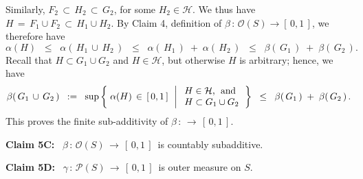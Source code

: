 Similarly, $F_{2} \,\subset\, H_{2} \,\subset\, G_{2}$, for some $H_{2} \in \mathcal{H}$.
We thus have $H \,=\, F_{1} \cup F_{2} \,\subset\, H_{1} \cup H_{2}$.
By Claim 4, definition of $\beta \,:\, \mathcal{O}(S) \longrightarrow [\,0,1\,]$, we therefore have
\begin{equation*}
\alpha(H)
\;\; \leq \;\; \alpha\!\left(\,H_{1}\,\cup\,H_{2}\,\right)
\;\; \leq \;\; \alpha\!\left(\,H_{1}\,\right) \; + \; \alpha\!\left(\,H_{2}\,\right)
\;\; \leq \;\; \beta\!\left(\,G_{1}\,\right) \; + \; \beta\!\left(\,G_{2}\,\right).
\end{equation*}
Recall that $H \subset G_{1} \cup G_{2}$ and $H \in \mathcal{H}$, but otherwise $H$ is arbitrary;
hence, we have
\begin{equation*}
\beta\!\left(\,G_{1}\,\cup\,G_{2}\,\right)
\;\; := \;\;
\sup\left\{\;
	\alpha(H) \,\in\, [\,0,1\,]
	\,\;\left\vert\;
		\begin{array}{l} H \in \mathcal{H}, \;\,\textnormal{and} \\ H \subset G_{1} \cup G_{2} \end{array}
	\right.
\right\}
\;\;\leq\;\; \beta\!\left(\,G_{1}\,\right) \; + \; \beta\!\left(\,G_{2}\,\right).
\end{equation*}
This proves the finite sub-additivity of $\beta \,: \,\longrightarrow\, [\,0,1\,]$.

\vskip 0.2cm
\begin{center}
\begin{minipage}{6.5in}
\textbf{Claim 5C:} \,
$\beta \,:\, \mathcal{O}(S) \,\longrightarrow\, [\,0,1\,]$\, is countably subadditive.
\end{minipage}
\end{center}

\vskip 0.2cm
\begin{center}
\begin{minipage}{6.5in}
\textbf{Claim 5D:} \,
$\gamma \,:\, \mathcal{P}(S) \,\longrightarrow\, [\,0,1\,]$\, is outer measure on $S$.
\end{minipage}
\end{center}

